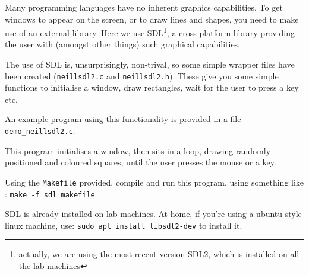 
Many programming languages have no inherent graphics capabilities.
To get windows to appear on the screen, or to draw lines and shapes,
you need to make use of an external library. Here we use SDL\footnote{
actually, we are using the most recent version SDL2, which is installed
on all the lab machines}, a cross-platform library providing the user with
(amongst other things) such graphical capabilities.


The use of SDL is, unsurprisingly, non-trival, so some simple wrapper
files have been created (\verb^neillsdl2.c^ and \verb^neillsdl2.h^).
These give you some simple functions to initialise a window, draw
rectangles, wait for the user to press a key etc.

An example program using this functionality is
provided in a file \verb^demo_neillsdl2.c^.

This program initialises a window, then sits in a loop, drawing
randomly positioned and coloured squares, until the
user presses the mouse or a key. 

\begin{exercise}
Using the \verb^Makefile^ provided, compile and run this program,
using something like : \verb^make -f sdl_makefile^

SDL is already installed on lab machines. At home, if you're using a
ubuntu-style linux machine, use: \verb^sudo apt install libsdl2-dev^
to install it.
\end{exercise}
